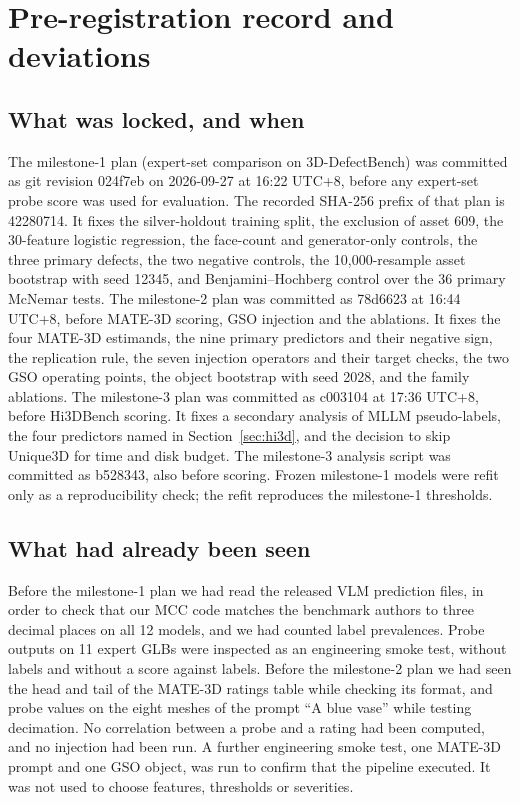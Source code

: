 \section{Pre-registration record and deviations}
\label{app:prereg}

\subsection{What was locked, and when}
The milestone-1 plan (expert-set comparison on 3D-DefectBench) was committed as git revision 024f7eb on 2026-09-27 at 16:22 UTC+8, before any expert-set probe score was used for evaluation.
The recorded SHA-256 prefix of that plan is 42280714.
It fixes the silver-holdout training split, the exclusion of asset 609, the 30-feature logistic regression, the face-count and generator-only controls, the three primary defects, the two negative controls, the 10{,}000-resample asset bootstrap with seed 12345, and Benjamini--Hochberg control over the 36 primary McNemar tests.
The milestone-2 plan was committed as 78d6623 at 16:44 UTC+8, before MATE-3D scoring, GSO injection and the ablations.
It fixes the four MATE-3D estimands, the nine primary predictors and their negative sign, the replication rule, the seven injection operators and their target checks, the two GSO operating points, the object bootstrap with seed 2028, and the family ablations.
The milestone-3 plan was committed as c003104 at 17:36 UTC+8, before Hi3DBench scoring.
It fixes a secondary analysis of MLLM pseudo-labels, the four predictors named in Section~\ref{sec:hi3d}, and the decision to skip Unique3D for time and disk budget.
The milestone-3 analysis script was committed as b528343, also before scoring.
Frozen milestone-1 models were refit only as a reproducibility check; the refit reproduces the milestone-1 thresholds.

\subsection{What had already been seen}
Before the milestone-1 plan we had read the released VLM prediction files, in order to check that our MCC code matches the benchmark authors to three decimal places on all 12 models, and we had counted label prevalences.
Probe outputs on 11 expert GLBs were inspected as an engineering smoke test, without labels and without a score against labels.
Before the milestone-2 plan we had seen the head and tail of the MATE-3D ratings table while checking its format, and probe values on the eight meshes of the prompt ``A blue vase'' while testing decimation.
No correlation between a probe and a rating had been computed, and no injection had been run.
A further engineering smoke test, one MATE-3D prompt and one GSO object, was run to confirm that the pipeline executed.
It was not used to choose features, thresholds or severities.

